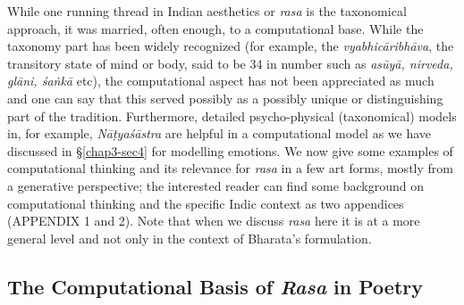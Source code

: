 While one running thread in Indian aesthetics or \textsl{rasa} is the taxonomical approach, it was married, often enough, to a computational base. While the taxonomy part has been widely recognized (for example, the \textsl{vyabhicāribhāva}, the transitory state of mind or body, said to be 34 in number such as \textsl{asūyā, nirveda, glāni, śaṅkā} etc), the computational aspect has not been appreciated as much and one can say that this served possibly as a possibly unique or distinguishing part of the tradition. Furthermore, detailed psycho-physical (taxonomical) models in, for example, \textsl{Nāṭyaśāstra} are helpful in a computational model as we have discussed in \S\ref{chap3-sec4} for modelling emotions. We now give some examples of computational thinking and its relevance for \textsl{rasa} in a few art forms, mostly from a generative perspective; the interested reader can find some background on computational thinking and the specific Indic context as two appendices (APPENDIX 1 and 2). Note that when we discuss \textsl{rasa} here it is at a more general level and not only in the context of Bharata’s formulation.\\[-20pt]

\subsection{The Computational Basis of \textsl{Rasa} in Poetry}\label{chap3-sec5.1}

